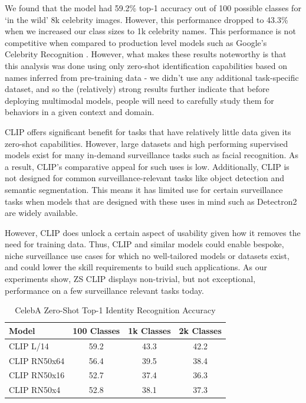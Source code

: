 \documentclass{article}
\begin{document}
We found that the model had 59.2\% top-1 accuracy out of 100 possible classes for `in the wild' 8k celebrity images. However, this performance dropped to 43.3\% when we increased our class sizes to 1k celebrity names. This performance is not competitive when compared to production level models such as Google's Celebrity Recognition \citep{Google}. However, what makes these results noteworthy is that this analysis was done using only zero-shot identification capabilities based on names inferred from pre-training data - we didn’t use any additional task-specific dataset, and so the (relatively) strong results further indicate that before deploying multimodal models, people will need to carefully study them for behaviors in a given context and domain.

CLIP offers significant benefit for tasks that have relatively little data given its zero-shot capabilities. However, large datasets and high performing supervised models exist for many in-demand surveillance tasks such as facial recognition. As a result, CLIP’s comparative appeal for such uses is low. Additionally, CLIP is not designed for common surveillance-relevant tasks like object detection and semantic segmentation. This means it has limited use for certain surveillance tasks when models that are designed with these uses in mind such as Detectron2 \citep{wu2019detectron2} are widely available.

However, CLIP does unlock a certain aspect of usability given how it removes the need for training data. Thus, CLIP and similar models could enable bespoke, niche surveillance use cases for which no well-tailored models or datasets exist, and could lower the skill requirements to build such applications. As our experiments show, ZS CLIP displays non-trivial, but not exceptional, performance on a few surveillance relevant tasks today. 

\begin{table}[t]
\vskip 0.17in
\begin{center}
\begin{normalsize}
\begin{tabular}{lccc}
\toprule
Model&100 Classes&
1k Classes&
2k Classes \\ \midrule
CLIP L/14&
59.2&
43.3&
42.2 \\
CLIP RN50x64&
56.4&
39.5&
38.4 \\
CLIP RN50x16&
52.7&
37.4&
36.3 \\
CLIP RN50x4&
52.8&
38.1&
37.3 \\
\bottomrule
\end{tabular}
\end{normalsize}
\caption{CelebA Zero-Shot Top-1 Identity Recognition Accuracy}
\label{celeba_table}
\end{center}
\vskip -0.2in
\end{table}
\end{document}
